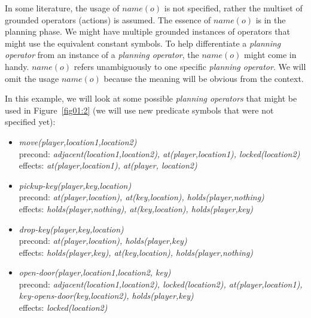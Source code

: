 \medskip\noindent
In some literature, the usage of $name(o)$ is not specified, rather the multiset of grounded operators (actions) is assumed. The essence of $name(o)$ is in the planning phase. We might have multiple grounded instances of operators that might use the equivalent constant symbols. To help differentiate a \emph{planning operator} from an instance of a \emph{planning operator}, the $name(o)$ might come in handy. $name(o)$ refers unambiguously to one specific \emph{planning operator}. We will omit the usage $name(o)$ because the meaning will be obvious from the context.


\begin{example}\label{ex01:4}
    In this example, we will look at some possible \emph{planning operators} that might be used in Figure~\ref{fig01:2} (we will use new predicate symbols that were not specified yet):

    \begin{itemize}
        \item \emph{move(player,location1,location2)} \\
        precond: \emph{adjacent(location1,location2), at(player,location1), \neg locked(location2)} \\
        effects: \emph{\neg at(player,location1), at(player, location2)}

        \item \emph{pickup-key(player,key,location)} \\
        precond: \emph{at(player,location), at(key,location), holds(player,nothing)} \\
        effects: \emph{\neg holds(player,nothing), \neg at(key,location), holds(player,key)}

        \item \emph{drop-key(player,key,location)} \\
        precond: \emph{at(player,location), holds(player,key)} \\
        effects: \emph{\neg holds(player,key), at(key,location), holds(player,nothing)}

        \item \emph{open-door(player,location1,location2, key)} \\
        precond: \emph{adjacent(location1,location2), locked(location2), at(player,location1), key-opens-door(key,location2), holds(player,key)} \\
        effects: \emph{\neg locked(location2)}
    \end{itemize}
\end{example}

